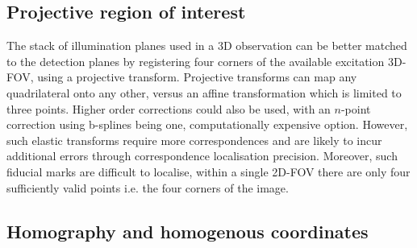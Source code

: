 \subsection{Projective region of interest}

The stack of illumination planes used in a \gls{3D} observation can be better matched to the detection planes by registering four corners of the available excitation \gls{3D}-\gls{FOV}, using a projective transform.%
Projective transforms can map any quadrilateral onto any other, versus an affine transformation which is limited to three points.
Higher order corrections could also be used, with an $n$-point correction using b-splines being one, computationally expensive option.
However, such elastic transforms require more correspondences and are likely to incur additional errors through correspondence localisation precision.
Moreover, such fiducial marks are difficult to localise, within a single \gls{2D}-\gls{FOV} there are only four sufficiently valid points i.e. the four corners of the image.%


\subsection{Homography and homogenous coordinates}

